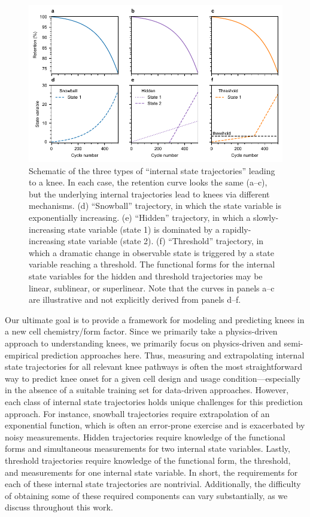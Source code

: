\documentclass[journal=jpclcd,manuscript=article]{achemso}
\begin{document}
\begin{figure}[htp]
    \centering
    \includegraphics[scale=1]{final_figures/snowball_hidden_threshold.pdf}
    \caption{Schematic of the three types of ``internal state trajectories'' leading to a knee. In each case, the retention curve looks the same (a--c), but the underlying internal trajectories lead to knees via different mechanisms. (d) ``Snowball'' trajectory, in which the state variable is exponentially increasing. (e) ``Hidden'' trajectory, in which a slowly-increasing state variable (state 1) is dominated by a rapidly-increasing state variable (state 2). (f) ``Threshold'' trajectory, in which a dramatic change in observable state is triggered by a state variable reaching a threshold.
    The functional forms for the internal state variables for the hidden and threshold trajectories may be linear, sublinear, or superlinear.
    Note that the curves in panels a--c are illustrative and not explicitly derived from panels d--f.
    }
    \label{fig:snowball_vs_hidden_vs_threshold}
\end{figure}

Our ultimate goal is to provide a framework for modeling and predicting knees in a new cell chemistry/form factor.
Since we primarily take a physics-driven approach to understanding knees, we primarily focus on physics-driven and semi-empirical prediction approaches here.
Thus, measuring and extrapolating internal state trajectories for all relevant knee pathways is often the most straightforward way to predict knee onset for a given cell design and usage condition---especially in the absence of a suitable training set for data-driven approaches.
However, each class of internal state trajectories holds unique challenges for this prediction approach.
For instance, snowball trajectories require extrapolation of an exponential function, which is often an error-prone exercise and is exacerbated by noisy measurements.
Hidden trajectories require knowledge of the functional forms and simultaneous measurements for two internal state variables.
Lastly, threshold trajectories require knowledge of the functional form, the threshold, and measurements for one internal state variable.
In short, the requirements for each of these internal state trajectories are nontrivial.
Additionally, the difficulty of obtaining some of these required components can vary substantially, as we discuss throughout this work.
\end{document}
